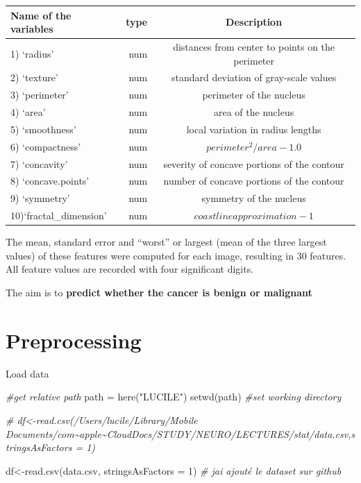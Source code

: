 \documentclass[
  11pt,
]{article}
\newenvironment{Shaded}{\begin{snugshade}}{\end{snugshade}}
\newcommand{\AttributeTok}[1]{\textcolor[rgb]{0.77,0.63,0.00}{#1}}
\newcommand{\CommentTok}[1]{\textcolor[rgb]{0.56,0.35,0.01}{\textit{#1}}}
\newcommand{\DecValTok}[1]{\textcolor[rgb]{0.00,0.00,0.81}{#1}}
\newcommand{\FunctionTok}[1]{\textcolor[rgb]{0.00,0.00,0.00}{#1}}
\newcommand{\NormalTok}[1]{#1}
\newcommand{\OtherTok}[1]{\textcolor[rgb]{0.56,0.35,0.01}{#1}}
\newcommand{\StringTok}[1]{\textcolor[rgb]{0.31,0.60,0.02}{#1}}
\begin{document}
\begin{longtable}[]{@{}lrc@{}}
\toprule
Name of the variables & type & Description \\
\midrule
\endhead
1) `radius' & num & distances from center to points on the perimeter \\
2) `texture' & num & standard deviation of gray-scale values \\
3) `perimeter' & num & perimeter of the nucleus \\
4) `area' & num & area of the nucleus \\
5) `smoothness' & num & local variation in radius lengths \\
6) `compactness' & num & \(perimeter^2 / area - 1.0\) \\
7) `concavity' & num & severity of concave portions of the contour \\
8) `concave.points' & num & number of concave portions of the contour \\
9) `symmetry' & num & symmetry of the nucleus \\
10)`fractal\_dimension' & num & \(coastline approximation - 1\) \\
\bottomrule
\end{longtable}

The mean, standard error and ``worst'' or largest (mean of the three
largest values) of these features were computed for each image,
resulting in 30 features. All feature values are recorded with four
significant digits.

The aim is to \textbf{predict whether the cancer is benign or malignant}

\hypertarget{preprocessing}{%
\section{Preprocessing}\label{preprocessing}}

Load data

\begin{Shaded}
\begin{Highlighting}[]
\CommentTok{\#get relative path}
\NormalTok{path }\OtherTok{=} \FunctionTok{here}\NormalTok{(}\StringTok{"LUCILE"}\NormalTok{)}
\FunctionTok{setwd}\NormalTok{(path) }\CommentTok{\#set working directory}

\CommentTok{\# df\textless{}{-}read.csv(\textquotesingle{}/Users/lucile/Library/Mobile Documents/com\textasciitilde{}apple\textasciitilde{}CloudDocs/STUDY/NEURO/LECTURES/stat/data.csv\textquotesingle{},stringsAsFactors = 1)}

\NormalTok{df}\OtherTok{\textless{}{-}}\FunctionTok{read.csv}\NormalTok{(}\StringTok{\textquotesingle{}data.csv\textquotesingle{}}\NormalTok{, }\AttributeTok{stringsAsFactors =} \DecValTok{1}\NormalTok{) }\CommentTok{\# j\textquotesingle{}ai  ajouté le dataset sur github}
\end{Highlighting}
\end{Shaded}
\end{document}
